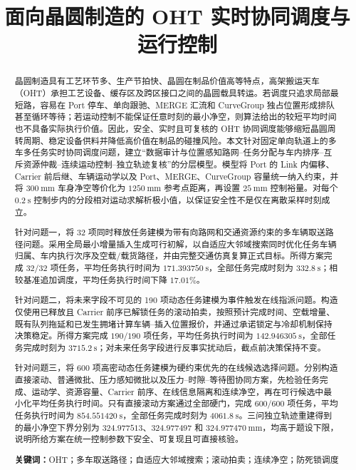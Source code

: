 \documentclass[UTF8]{ctexart}
\title{\textbf{面向晶圆制造的 OHT 实时协同调度与运行控制}}
\author{}
\date{}
\begin{document}
\setcounter{page}{1}
\maketitle
\vspace{-0.95cm}

\renewcommand{\abstractname}{\sihao 摘\quad 要}
\begin{abstract}\xiaosihao
晶圆制造具有工艺环节多、生产节拍快、晶圆在制品价值高等特点，高架搬运天车（OHT）承担工艺设备、缓存区及跨区接口之间的晶圆载具转运。若调度只追求局部最短路，容易在 Port 停车、单向跟驰、MERGE 汇流和 CurveGroup 独占位置形成排队甚至循环等待；若运动控制不能保证任意时刻的最小净空，则算法给出的较短平均时间也不具备实际执行价值。因此，安全、实时且可复核的 OHT 协同调度能够缩短晶圆周转周期、稳定设备供料并降低高价值在制品的碰撞风险。本文针对固定单向轨道上的多车多任务实时协同调度问题，建立“数据审计与位置感知路网--任务分配与车内排序--互斥资源仲裁--连续运动控制--独立轨迹复核”的分层模型。模型将 Port 的 Link 内偏移、Carrier 前后继、车辆运动学以及 Port、MERGE、CurveGroup 容量统一纳入约束，并将 $300\ \mathrm{mm}$ 车身净空等价化为 $1250\ \mathrm{mm}$ 参考点距离，再设置 $25\ \mathrm{mm}$ 控制裕量。对每个 $0.2\ \mathrm{s}$ 控制步内的分段相对运动求解析极小值，以保证安全性不是仅在离散采样时刻成立。

针对问题一，将 32 项同时释放任务建模为带有向路网和交通资源约束的多车辆取送路径问题。采用全局最小增量插入生成可行初解，以自适应大邻域搜索同时优化任务车辆归属、车内执行次序及空载/载货路径，并由完整交通仿真复算正式目标。所得方案完成 $32/32$ 项任务，平均任务执行时间为 $171.393750\ \mathrm{s}$，全部任务完成时刻为 $332.8\ \mathrm{s}$；相较基准追加调度，平均任务执行时间下降 $17.01\%$。

针对问题二，将未来字段不可见的 190 项动态任务建模为事件触发在线指派问题。构造仅使用已释放且 Carrier 前序已解锁任务的滚动拍卖，按照预计完成时间、空载增量、既有队列拖延和已发生拥堵计算车辆--插入位置报价，并通过承诺锁定与冷却机制保持决策稳定。所得方案完成 $190/190$ 项任务，平均任务执行时间为 $142.946305\ \mathrm{s}$，全部任务完成时刻为 $3715.2\ \mathrm{s}$；对未来任务字段进行反事实扰动后，截点前决策保持不变。

针对问题三，将 600 项高密动态任务建模为硬约束优先的在线候选选择问题。分别构造直接滚动、普通微批、压力感知微批以及压力--时隙--等待图协同方案，先检验任务完成、运动学、资源容量、Carrier 前序、在线信息隔离和连续净空，再在可行候选中最小化平均任务执行时间。只有直接滚动方案通过全部硬门，完成 $600/600$ 项任务，平均任务执行时间为 $854.551420\ \mathrm{s}$，全部任务完成时刻为 $4061.8\ \mathrm{s}$。三问独立轨迹重建得到的最小净空下界分别为 $324.977513$、$324.977497$ 和 $324.977470\ \mathrm{mm}$，均高于题设下限，说明所给方案在统一控制参数下安全、可复现且可直接核验。

\textbf{关键词：}\quad OHT；多车取送路径；自适应大邻域搜索；滚动拍卖；连续净空；防死锁调度
\end{abstract}
\end{document}
